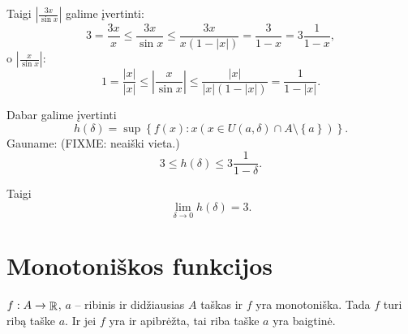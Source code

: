 \begin{exmp}
  Taigi $\left| \frac{3x}{\sin x} \right|$ galime įvertinti:
  \begin{equation*}
    3 = \frac{3x}{x} \leq \frac{3x}{\sin x} \leq \frac{3x}{x(1 - |x|)}
    = \frac{3}{1 - x} = 3 \frac{1}{1 - x},
  \end{equation*}
  o $\left| \frac{x}{\sin x} \right|$:
  \begin{equation*}
    1 = \frac{|x|}{|x|} \leq \left| \frac{x}{\sin x} \right| \leq
    \frac{|x|}{|x|(1 - |x|)} = \frac{1}{1 - |x|}.
  \end{equation*}

  Dabar galime įvertinti
  \begin{equation*}
    h(\delta) = \sup \left\{ f(x) : x 
      (x \in U(a, \delta) \cap A \setminus \left\{ a \right\}) \right\}.
  \end{equation*}
  Gauname: (FIXME: neaiški vieta.)
  \begin{equation*}
    3 \leq h(\delta) \leq 3 \frac{1}{1 - \delta}.
  \end{equation*}

  Taigi
  \begin{equation*}
    \lim_{\delta \to 0} h(\delta) = 3.
  \end{equation*}
\end{exmp}

\section{Monotoniškos funkcijos}

\begin{prop}
  \label{lim_mon}
  $f: A \to \mathop{\mathbb{R}}$, $a$ – ribinis ir didžiausias $A$ taškas ir $f$ yra
  monotoniška. Tada $f$ turi ribą taške $a$. Ir jei $f$ yra ir apibrėžta,
  tai riba taške $a$ yra baigtinė.
\end{prop}

